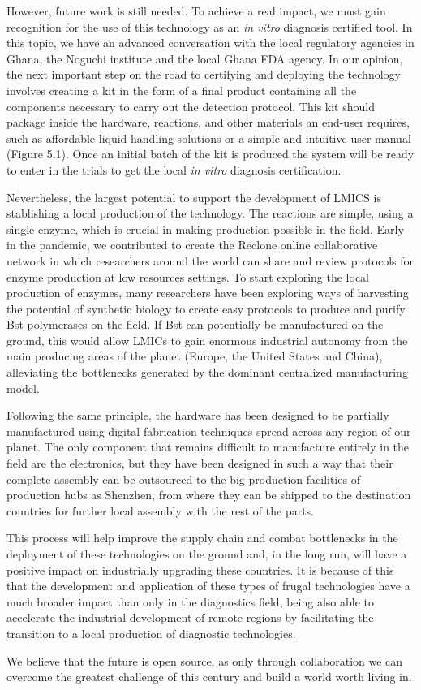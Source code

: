 However, future work is still needed. To achieve a real impact, we must gain recognition for the use of this technology as an \emph{in vitro} diagnosis certified tool. In this topic, we have an advanced conversation with the local regulatory agencies in Ghana, the Noguchi institute and the local Ghana FDA agency. In our opinion, the next important step on the road to certifying and deploying the technology involves creating a kit in the form of a final product containing all the components necessary to carry out the detection protocol. This kit should package inside the hardware, reactions, and other materials an end-user requires, such as affordable liquid handling solutions or a simple and intuitive user manual (Figure 5.1). Once an initial batch of the kit is produced the system will be ready to enter in the trials to get the local \emph{in vitro} diagnosis certification.
        
Nevertheless, the largest potential to support the development of LMICS is stablishing a local production of the technology. The reactions are simple, using a single enzyme, which is crucial in making production possible in the field. Early in the pandemic, we contributed to create the Reclone online collaborative network \cite{recloneorg_reagent_nodate} in which researchers around the world can share and review protocols for enzyme production at low resources settings. To start exploring the local production of enzymes, many researchers have been exploring ways of harvesting the potential of synthetic biology to create easy protocols to produce and purify Bst polymerases on the field\cite{rivera_recombinant_2020}. If Bst can potentially be manufactured on the ground, this would allow LMICs to gain enormous industrial autonomy from the main producing areas of the planet (Europe, the United States and China), alleviating the bottlenecks generated by the dominant centralized manufacturing model.
        
Following the same principle, the hardware has been designed to be partially manufactured using digital fabrication techniques spread across any region of our planet. The only component that remains difficult to manufacture entirely in the field are the electronics, but they have been designed in such a way that their complete assembly can be outsourced to the big production facilities of production hubs as Shenzhen, from where they can be shipped to the destination countries for further local assembly with the rest of the parts.
        
This process will help improve the supply chain and combat bottlenecks in the deployment of these technologies on the ground and, in the long run, will have a positive impact on industrially upgrading these countries. It is because of this that the development and application of these types of frugal technologies have a much broader impact than only in the diagnostics field, being also able to accelerate the industrial development of remote regions by facilitating the transition to a local production of diagnostic technologies.
        
We believe that the future is open source, as only through collaboration we can overcome the greatest challenge of this century and build a world worth living in.
        
        
        
        

